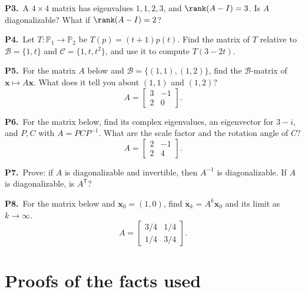 \documentclass[10pt]{scrartcl}
\newcommand{\vv}[1]{\mathbf{#1}}
\begin{document}
\begin{prob}
  \textbf{P3.}\ A $4\times 4$ matrix has eigenvalues $1,1,2,3$, and $\rank(A-I)=3$. Is $A$ diagonalizable? What if $\rank(A-I)=2$?
\end{prob}

\begin{prob}
  \textbf{P4.}\ Let $T\colon\mathbb P_1\to\mathbb P_2$ be $T(p)=(t+1)p(t)$. Find the matrix of $T$ relative to $\mathcal B=\{1,t\}$ and $\mathcal C=\{1,t,t^2\}$, and use it to compute $T(3-2t)$.
\end{prob}

\begin{prob}
  \textbf{P5.}\ For the matrix $A$ below and $\mathcal B=\{(1,1),(1,2)\}$, find the $\mathcal B$-matrix of $\vv x\mapsto A\vv x$. What does it tell you about $(1,1)$ and $(1,2)$?
  \[
    A = \begin{bmatrix}3&-1\\2&0\end{bmatrix}.
  \]
\end{prob}

\begin{prob}
  \textbf{P6.}\ For the matrix below, find its complex eigenvalues, an eigenvector for $3-i$, and $P,C$ with $A=PCP^{-1}$. What are the scale factor and the rotation angle of $C$?
  \[
    A = \begin{bmatrix}2&-1\\2&4\end{bmatrix}.
  \]
\end{prob}

\begin{prob}
  \textbf{P7.}\ Prove: if $A$ is diagonalizable and invertible, then $A^{-1}$ is diagonalizable. If $A$ is diagonalizable, is $A^{\mathsf T}$?
\end{prob}

\begin{prob}
  \textbf{P8.}\ For the matrix below and $\vv x_0=(1,0)$, find $\vv x_k=A^k\vv x_0$ and its limit as $k\to\infty$.
  \[
    A = \begin{bmatrix}3/4&1/4\\1/4&3/4\end{bmatrix}.
  \]
\end{prob}

\section{Proofs of the facts used}
\end{document}
